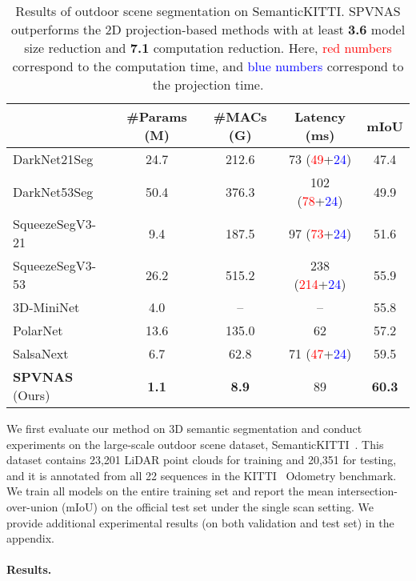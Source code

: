 \documentclass[runningheads]{llncs}
\def\modelshort{SPVNAS\xspace}
\begin{document}
\begin{table}[t]
\setlength{\tabcolsep}{7.5pt}
\small\centering
\begin{tabular}{lcccc}
    \toprule
     & \#Params (M) & \#MACs (G) & Latency (ms) & mIoU \\
    \midrule
    DarkNet21Seg~\cite{behley2019semantickitti} & 24.7 & 212.6 & 73 (\textcolor{red}{49}+\textcolor{blue}{24}) & 47.4 \\
    DarkNet53Seg~\cite{behley2019semantickitti} & 50.4 & 376.3 & 102 (\textcolor{red}{78}+\textcolor{blue}{24}) & 49.9 \\
    SqueezeSegV3-21~\cite{xu2020squeezesegv3} & 9.4 & 187.5 & 97 (\textcolor{red}{73}+\textcolor{blue}{24}) & 51.6 \\
    SqueezeSegV3-53~\cite{xu2020squeezesegv3} & 26.2 & 515.2 & 238 (\textcolor{red}{214}+\textcolor{blue}{24}) & 55.9 \\
    3D-MiniNet~\cite{alonso20203d} & 4.0 & -- & -- & 55.8 \\
    PolarNet~\cite{zhang2020polarnet} & 13.6 & 135.0 & 62 & 57.2 \\
    SalsaNext~\cite{cortinhal2020salsanext} & 6.7 & 62.8 & 71 (\textcolor{red}{47}+\textcolor{blue}{24}) & 59.5 \\
    \midrule
    \textbf{\modelshort} (Ours) & \textbf{1.1} & \textbf{8.9} & 89 & \textbf{60.3} \\
    \bottomrule
\end{tabular}
\caption{Results of outdoor scene segmentation on SemanticKITTI. \modelshort outperforms the 2D projection-based methods with at least \textbf{3.6} model size reduction and \textbf{7.1} computation reduction. Here, \textcolor{red}{red numbers} correspond to the computation time, and \textcolor{blue}{blue numbers} correspond to the projection time.}
\label{tab:semantickitti:results:2d}
\end{table} 
We first evaluate our method on 3D semantic segmentation and conduct experiments on the large-scale outdoor scene dataset, SemanticKITTI~\cite{behley2019semantickitti}. This dataset contains 23,201 LiDAR point clouds for training and 20,351 for testing, and it is annotated from all 22 sequences in the KITTI~\cite{geiger2013vision} Odometry benchmark. We train all models on the entire training set and report the mean intersection-over-union (mIoU) on the official test set under the single scan setting. We provide additional experimental results (on both validation and test set) in the appendix.

\paragraph{Results.}
\end{document}
